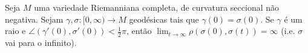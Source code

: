 \begin{exercise}
\label{exercise-l8-11}
Seja $M$ uma variedade Riemanniana completa, de curvatura seccional não
negativa. Sejam $\gamma,\sigma:[0,\infty) \to M$ geodésicas tais que
$\gamma(0)=\sigma(0)$. Se $\gamma$ é um raio e
$\angle(\gamma'(0),\sigma'(0))<\frac{1}{2}\pi$, então $\lim_{t \to \infty}
\rho(\sigma(0),\sigma(t))=\infty$ (i.e. $\sigma$ vai para o infinito).
\end{exercise}

